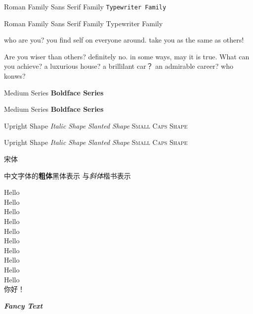\documentclass[10pt]{article}
\newcommand{\myfont}{\textit{\textbf{\textsf{Fancy Text}}}}c %
\begin{document}
	\textrm{Roman Family}  \textsf{Sans Serif Family}  \texttt{Typewriter Family}
	
	 
	 
	\rmfamily Roman Family  {\sffamily Sans Serif Family}   {\ttfamily Typewriter Family}
	
	{\sffamily who are you? you find self on everyone around. take you as the same as others!}
	
	{\ttfamily Are you wiser than others? definitely no. in some ways,
	may it is true. What can you achieve? a luxurious house? a brillilant car？ an admirable career? 
	who konws?}
	
	\textmd{Medium Series}  \textbf{Boldface Series}
	
	{\mdseries Medium Series}    {\bfseries Boldface Series}
	
	\textup{Upright Shape} \textit{Italic Shape}
	\textsl{Slanted Shape}  \textsc{Small Caps Shape}
	
	{\upshape Upright Shape}  {\itshape Italic Shape} 
        {\slshape Slanted Shape} {\scshape Small Caps Shape}
        
        {\songti 宋体}      
        
       中文字体的\textbf{粗体}黑体表示 与\textit{斜体}楷书表示
       
       {\tiny Hello}\\
       {\scriptsize Hello}\\
       {\footnotesize Hello}\\
       {\small Hello}\\
       {\normalsize Hello}\\
       {\large Hello}\\
       {\Large Hello}\\
       {\LARGE Hello}\\
       {\huge Hello}\\
       {\Huge Hello}\\
       
        你好！ %
       
       
       \myfont
      
        
	
\end{document}
